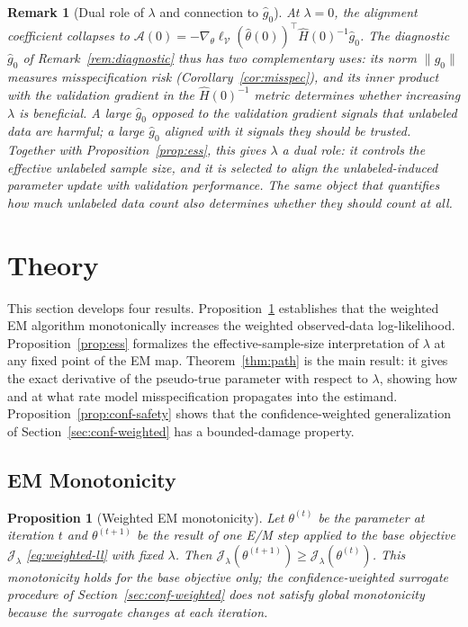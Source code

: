 \documentclass[11pt]{article}
\newtheorem{proposition}{Proposition}
\newtheorem{remark}{Remark}
\theoremstyle{definition}
\newcommand{\calJ}{\mathcal{J}}
\newcommand{\lam}{\lambda}
\newcommand{\calV}{\mathcal{V}}
\newcommand{\calA}{\mathcal{A}}
\begin{document}
\begin{remark}[Dual role of \(\lambda\) and connection to \(\hat g_0\)]
\label{rem:dual-lambda}
At \(\lam=0\), the alignment coefficient collapses to
\(\calA(0) = -\nabla_\theta\ell_{\calV}(\hat\theta(0))^\top\hat H(0)^{-1}\hat g_0\).
The diagnostic \(\hat g_0\) of Remark~\ref{rem:diagnostic} thus has
two complementary uses: its norm \(\|\hat g_0\|\) measures misspecification
risk (Corollary~\ref{cor:misspec}), and its inner product with the validation
gradient in the \(\hat H(0)^{-1}\) metric determines whether increasing
\(\lam\) is beneficial.
A large \(\hat g_0\) opposed to the validation gradient signals that
unlabeled data are harmful; a large \(\hat g_0\) aligned with it signals
they should be trusted.
Together with Proposition~\ref{prop:ess}, this gives \(\lam\) a dual role:
it controls the effective unlabeled sample size, and it is selected to
align the unlabeled-induced parameter update with validation performance.
The same object that quantifies how much unlabeled data count
also determines whether they should count at all.
\end{remark}


\section{Theory}
\label{sec:theory}

This section develops four results.
Proposition~\ref{prop:em} establishes that the weighted EM algorithm
monotonically increases the weighted observed-data log-likelihood.
Proposition~\ref{prop:ess} formalizes the effective-sample-size
interpretation of \(\lam\) at any fixed point of the EM map.
Theorem~\ref{thm:path} is the main result: it gives the exact derivative
of the pseudo-true parameter with respect to \(\lam\), showing how and
at what rate model misspecification propagates into the estimand.
Proposition~\ref{prop:conf-safety} shows that the confidence-weighted
generalization of Section~\ref{sec:conf-weighted} has a bounded-damage property.

\subsection{EM Monotonicity}

\begin{proposition}[Weighted EM monotonicity]
\label{prop:em}
Let \(\theta^{(t)}\) be the parameter at iteration \(t\) and
\(\theta^{(t+1)}\) be the result of one E/M step applied to the
base objective \(\calJ_\lam\) \eqref{eq:weighted-ll} with fixed \(\lam\).
Then \(\calJ_\lam(\theta^{(t+1)}) \geq \calJ_\lam(\theta^{(t)})\).
This monotonicity holds for the base objective only; the confidence-weighted
surrogate procedure of Section~\ref{sec:conf-weighted} does not satisfy
global monotonicity because the surrogate changes at each iteration.
\end{proposition}
\end{document}
